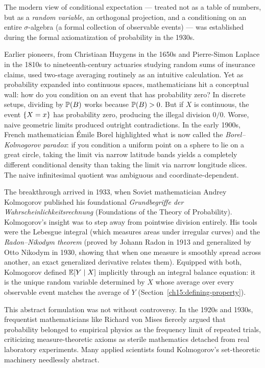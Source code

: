 \begin{historybox}
The modern view of conditional expectation --- treated not as a table of numbers, but as a \emph{random
variable}, an orthogonal projection, and a conditioning on an entire $\sigma$-algebra (a formal collection of
observable events) --- was established during the formal axiomatization of probability in the 1930s.

Earlier pioneers, from Christiaan Huygens in the 1650s and Pierre-Simon Laplace in the 1810s to nineteenth-century
actuaries studying random sums of insurance claims, used two-stage averaging routinely as an intuitive calculation.
Yet as probability expanded into continuous spaces, mathematicians hit a conceptual wall: how do you condition
on an event that has probability zero? In discrete setups, dividing by $\P(B)$ works because $\P(B) > 0$. But if
$X$ is continuous, the event $\set{X = x}$ has probability zero, producing the illegal division $0/0$. Worse, naive
geometric limits produced outright contradictions. In the early 1900s, French mathematician \'Emile Borel
highlighted what is now called the \emph{Borel--Kolmogorov paradox}: if you condition a uniform point on a sphere
to lie on a great circle, taking the limit via narrow latitude bands yields a completely different conditional
density than taking the limit via narrow longitude slices. The naive infinitesimal quotient was ambiguous and
coordinate-dependent.

The breakthrough arrived in 1933, when Soviet mathematician Andrey Kolmogorov published his foundational
\emph{Grundbegriffe der Wahrscheinlichkeitsrechnung} (Foundations of the Theory of Probability). Kolmogorov's
insight was to step away from pointwise division entirely. His tools were the Lebesgue integral (which measures
areas under irregular curves) and the \emph{Radon--Nikodym theorem} (proved by Johann Radon in 1913 and
generalized by Otto Nikodym in 1930, showing that when one measure is smoothly spread across another, an exact
generalized derivative relates them). Equipped with both, Kolmogorov defined $\E[Y \given X]$ implicitly through an
integral balance equation: it is the unique random variable determined by $X$ whose average over every observable
event matches the average of $Y$ (Section~\ref{ch15:defining-property}).

This abstract formulation was not without controversy. In the 1920s and 1930s, frequentist mathematicians like
Richard von Mises fiercely argued that probability belonged to empirical physics as the frequency limit of repeated
trials, criticizing measure-theoretic axioms as sterile mathematics detached from real laboratory experiments.
Many applied scientists found Kolmogorov's set-theoretic machinery needlessly abstract.


\end{historybox}
